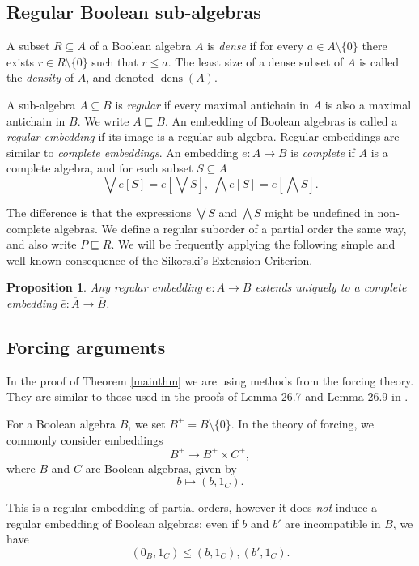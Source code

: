 \documentclass[11pt]{amsart}
\newtheorem{prop}[thm]{Proposition}
\theoremstyle{definition}
\DeclareMathOperator{\dens}{dens}
\newcommand{\s}{\subseteq}
\begin{document}
\subsection{Regular Boolean sub-algebras}

A subset $R \s A$ of a Boolean algebra $A$ is \emph{dense} if for every $a \in A\setminus \{0\}$ there exists $r \in R\setminus \{0\}$ such that $r \leq a$. The least size of a dense subset of $A$ is called the \emph{density} of $A$, and denoted $\dens(A)$.

A sub-algebra $A\subseteq B$ is \emph{regular} if every maximal antichain in $A$ is also a maximal antichain in $B$. We write $A \sqsubseteq B$. An embedding of Boolean algebras is called a \emph{regular embedding} if its image is a regular sub-algebra. Regular embeddings are similar to \emph{complete embeddings}. An embedding $e:A\longrightarrow B$ is \emph{complete} if $A$ is a complete algebra, and for each subset $S \subseteq A$
$$\bigvee e[S]= e[\bigvee S], \; \bigwedge e[S]=e[\bigwedge S].$$

The difference is that the expressions $\bigvee S$ and $\bigwedge S$ might be undefined in non-complete algebras. We define a regular suborder of a partial order the same way, and also write $P \sqsubseteq R$. We will be frequently applying the following simple and well-known consequence of the Sikorski's Extension Criterion.

\begin{prop}\label{extension}
	Any regular embedding $e:A\longrightarrow B$ extends uniquely to a complete embedding
	$\bar{e}:\overline{A}\longrightarrow \overline{B}$.
\end{prop}


\subsection{Forcing arguments}

In the proof of Theorem \ref{mainthm} we are using methods from the forcing theory. They are similar to those used in the proofs of Lemma 26.7 and Lemma 26.9 in \cite{jech}. 

\par For a Boolean algebra $B$, we set $B^+=B \setminus \{0\}$. In the theory of forcing, we commonly consider embeddings $$B^+ \longrightarrow B^+\times C^+,$$
where $B$ and $C$ are Boolean algebras, given by
$$b \mapsto (b,1_C).$$

This is a regular embedding of partial orders, however it does \emph{not} induce a regular embedding of Boolean algebras: even if $b$ and $b'$ are incompatible in $B$, we have 
$$(0_B,1_C)\leq (b,1_C),(b',1_C).$$
\end{document}
